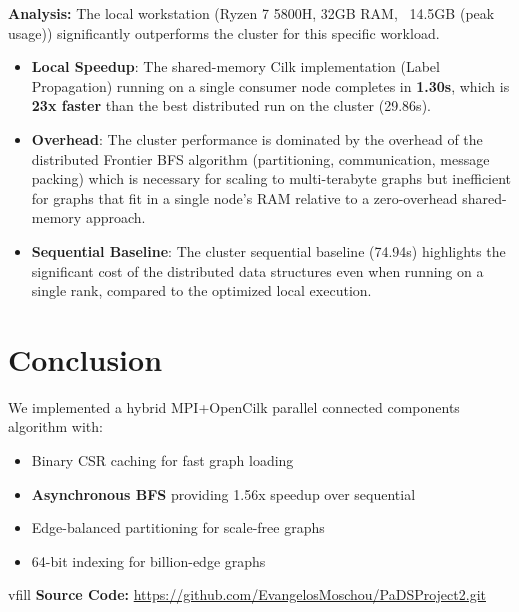 \documentclass[11pt,a4paper]{article}
\begin{document}
\textbf{Analysis:}
The local workstation (Ryzen 7 5800H, 32GB RAM, ~14.5GB (peak usage)) significantly outperforms the cluster for this specific workload.
\begin{itemize}
    \item \textbf{Local Speedup}: The shared-memory Cilk implementation (Label Propagation) running on a single consumer node completes in \textbf{1.30s}, which is \textbf{23x faster} than the best distributed run on the cluster (29.86s).
    \item \textbf{Overhead}: The cluster performance is dominated by the overhead of the distributed Frontier BFS algorithm (partitioning, communication, message packing) which is necessary for scaling to multi-terabyte graphs but inefficient for graphs that fit in a single node's RAM relative to a zero-overhead shared-memory approach.
    \item \textbf{Sequential Baseline}: The cluster sequential baseline (74.94s) highlights the significant cost of the distributed data structures even when running on a single rank, compared to the optimized local execution.
\end{itemize}

\section{Conclusion}

We implemented a hybrid MPI+OpenCilk parallel connected components algorithm with:
\begin{itemize}
    \item Binary CSR caching for fast graph loading
    \item \textbf{Asynchronous BFS} providing 1.56x speedup over sequential
    \item Edge-balanced partitioning for scale-free graphs
    \item 64-bit indexing for billion-edge graphs
\end{itemize}


vfill
\noindent\textbf{Source Code:} \url{https://github.com/EvangelosMoschou/PaDSProject2.git}
\end{document}
